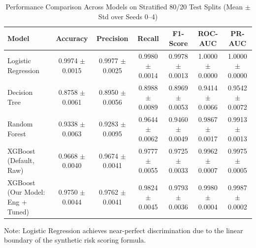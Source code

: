 \begin{table}[htbp]
\centering
\caption{Performance Comparison Across Models on Stratified 80/20 Test Splits (Mean $\pm$ Std over Seeds 0--4)}
\label{tab:model_comparison}
\begin{tabular}{lcccccc}
\toprule
\textbf{Model} & \textbf{Accuracy} & \textbf{Precision} & \textbf{Recall} & \textbf{F1-Score} & \textbf{ROC-AUC} & \textbf{PR-AUC} \\
\midrule
Logistic Regression & 0.9974 $\pm$ 0.0015 & 0.9977 $\pm$ 0.0025 & 0.9980 $\pm$ 0.0014 & 0.9978 $\pm$ 0.0013 & 1.0000 $\pm$ 0.0000 & 1.0000 $\pm$ 0.0000 \\
Decision Tree & 0.8758 $\pm$ 0.0061 & 0.8950 $\pm$ 0.0056 & 0.8988 $\pm$ 0.0089 & 0.8969 $\pm$ 0.0053 & 0.9414 $\pm$ 0.0066 & 0.9542 $\pm$ 0.0072 \\
Random Forest & 0.9338 $\pm$ 0.0063 & 0.9283 $\pm$ 0.0095 & 0.9644 $\pm$ 0.0062 & 0.9460 $\pm$ 0.0049 & 0.9867 $\pm$ 0.0017 & 0.9913 $\pm$ 0.0013 \\
XGBoost (Default, Raw) & 0.9668 $\pm$ 0.0040 & 0.9674 $\pm$ 0.0041 & 0.9777 $\pm$ 0.0055 & 0.9725 $\pm$ 0.0033 & 0.9962 $\pm$ 0.0007 & 0.9975 $\pm$ 0.0005 \\
XGBoost (Our Model: Eng + Tuned) & 0.9750 $\pm$ 0.0044 & 0.9762 $\pm$ 0.0041 & 0.9824 $\pm$ 0.0045 & 0.9793 $\pm$ 0.0036 & 0.9980 $\pm$ 0.0004 & 0.9987 $\pm$ 0.0002 \\
\bottomrule
\end{tabular}
\begin{flushleft}
\small Note: Logistic Regression achieves near-perfect discrimination due to the linear boundary of the synthetic risk scoring formula.
\end{flushleft}
\end{table}
